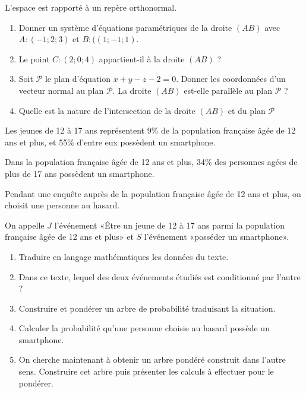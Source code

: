 \begin{question}[topic=géométrie,class=IG]
  L'espace est rapporté à un repère orthonormal.

  \begin{enumerate}
    \item Donner un système d'équations paramétriques de la droite $(AB)$
      avec $A : (-1; 2; 3)$ et $B : ((1; -1 ; 1)$.
      \item Le point $C : (2;0;4)$ appartient-il à la droite $(AB)$ ?
    \item Soit $\mathcal{P}$ le plan d'équation $x + y - z - 2  = 0$. Donner
      les coordonnées d'un vecteur normal au plan $\mathcal{P}$. La droite
      $(AB)$ est-elle parallèle au plan $\mathcal{P}$ ?
    \item Quelle est la nature de l'intersection de la droite $(AB)$ et du
      plan $\mathcal{P}$
  \end{enumerate}
\end{question}

\begin{question}[topic=probabilité,class=IG]
  Les jeunes de 12 à 17 ans représentent 9\% de la population française âgée
  de 12 ans et plus, et 55\% d'entre eux possèdent un smartphone.

  Dans la population française âgée de 12 ans et plus, 34\% des personnes
  agées de plus de 17 ans possèdent un smartphone.

  Pendant une enquête auprès de la population française âgée de 12 ans et
  plus, on choisit une personne au hasard.

  On appelle $J$ l'événement «Être un jeune de 12 à 17 ans parmi la
  population française âgée de 12 ans et plus» et $S$ l'événement «posséder
  un smartphone».

  \begin{enumerate}
    \item Traduire en langage mathématiques les données du texte.
    \item Dans ce texte, lequel des deux événements étudiés est conditionné
      par l'autre ?
    \item Construire et pondérer un arbre de probabilité traduisant la
      situation.
    \item Calculer la probabilité qu'une personne choisie au hasard possède
      un smartphone.
    \item On cherche maintenant à obtenir un arbre pondéré construit dans
      l'autre sens. Construire cet arbre puis présenter les calculs à
      effectuer pour le pondérer.
  \end{enumerate}
\end{question}

